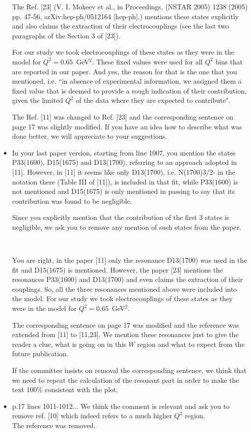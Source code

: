 \documentclass[superscriptaddress,showpacs,amssymb,amsmath,amsfonts,linenumbers,article]{revtex4-1}
\begin{document}
\begin{itemize}
{The Ref. [23] (V. I. Mokeev et al., in Proceedings, (NSTAR 2005) 1238 (2005) pp. 47-56, arXiv:hep-ph/0512164 [hep-ph].) mentions these states explicitly and also claims the extraction of their electrocouplings (see the last two paragraphs of the  Section 3 of [23]). 

For our study we took electrocouplings of these states as they were in the model for $Q^{2} = 0.65$~GeV$^{2}$. These fixed values were used for all $Q^{2}$ bins that are reported in our paper. And yes, the reason for that is the one that you mentioned, i.e. ``in absence of experimental information, we assigned them a fixed value that is deemed to provide a rough indication of their contribution, given the limited $Q^2$ of the data where they are expected to contribute".  

The Ref. [11] was changed to Ref. [23] and the corresponding sentence on page 17 was slightly modified. If you have an idea how to describe what was done better, we will appreciate to your suggestions. 
} 


\item {\color{red} In your last paper version, starting from line 1007, you mention the states P33(1600), D15(1675) and D13(1700), referring to an approach adopted in [11]. However, in [11] it seems like only D13(1700), i.e. N(1700)3/2- in the notation there (Table III of [11]), is included in that fit, while P33(1600) is not mentioned and D15(1675) is only mentioned in passing to say that its contribution was found to be negligible. 

Since you explicitly mention that the contribution of the first 3 states is negligible, we ask you to remove any mention of such states from the paper.} \\
{\color{blue} You are right, in the paper [11] only the resonance D13(1700) was used in the fit and D15(1675) is mentioned. However, the paper [23] mentions the resonances P33(1600) and D13(1700) and even claims the extraction of their couplings. So, all the three resonances mentioned above were included into the model. For our study we took electrocouplings of these states as they were in the model for $Q^{2} = 0.65$~GeV$^{2}$.

The corresponding sentence on page 17 was modified and the reference was extended from [11] to [11,23]. We mention these resonances just to give the reader a clue, what is going on in this $W$ region and what to expect from the future publication.

If the committee insists on removal the corresponding sentence, we think that we need to repeat the calculation of the resonant part in order to make the text 100\% consistent with the plot.} 


\item p.17 lines 1011-1012... {\color{red} We think the comment is relevant and ask you to remove ref. [10] which indeed refers to a much higher $Q^2$ region.}\\
{\color{blue} The reference was removed.}



\end{itemize}
\end{document}
